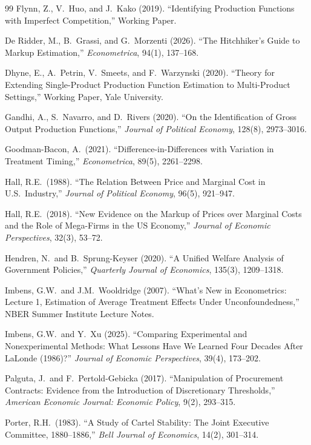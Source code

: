 \documentclass[11pt]{article}
\begin{document}
\begin{thebibliography}{99}
 Flynn, Z., V.~Huo, and J.~Kako (2019). ``Identifying Production Functions with Imperfect Competition,'' Working Paper.

 De Ridder, M., B.~Grassi, and G.~Morzenti (2026). ``The Hitchhiker's Guide to Markup Estimation,'' \emph{Econometrica}, 94(1), 137--168.

 Dhyne, E., A.\ Petrin, V.\ Smeets, and F.\ Warzynski (2020). ``Theory for Extending Single-Product Production Function Estimation to Multi-Product Settings,'' Working Paper, Yale University.

 Gandhi, A., S.~Navarro, and D.~Rivers (2020). ``On the Identification of Gross Output Production Functions,'' \emph{Journal of Political Economy}, 128(8), 2973--3016.

 Goodman-Bacon, A.\ (2021). ``Difference-in-Differences with Variation in Treatment Timing,'' \emph{Econometrica}, 89(5), 2261--2298.

 Hall, R.E.\ (1988). ``The Relation Between Price and Marginal Cost in U.S.\ Industry,'' \emph{Journal of Political Economy}, 96(5), 921--947.

 Hall, R.E.\ (2018). ``New Evidence on the Markup of Prices over Marginal Costs and the Role of Mega-Firms in the US Economy,'' \emph{Journal of Economic Perspectives}, 32(3), 53--72.

 Hendren, N.\ and B.\ Sprung-Keyser (2020). ``A Unified Welfare Analysis of Government Policies,'' \emph{Quarterly Journal of Economics}, 135(3), 1209--1318.

 Imbens, G.W.\ and J.M.\ Wooldridge (2007). ``What's New in Econometrics: Lecture 1, Estimation of Average Treatment Effects Under Unconfoundedness,'' NBER Summer Institute Lecture Notes.

 Imbens, G.W.\ and Y.~Xu (2025). ``Comparing Experimental and Nonexperimental Methods: What Lessons Have We Learned Four Decades After LaLonde (1986)?'' \emph{Journal of Economic Perspectives}, 39(4), 173--202.

 Palguta, J.\ and F.~Pertold-Gebicka (2017). ``Manipulation of Procurement Contracts: Evidence from the Introduction of Discretionary Thresholds,'' \emph{American Economic Journal: Economic Policy}, 9(2), 293--315.

 Porter, R.H.\ (1983). ``A Study of Cartel Stability: The Joint Executive Committee, 1880--1886,'' \emph{Bell Journal of Economics}, 14(2), 301--314.


\end{thebibliography}
\end{document}
